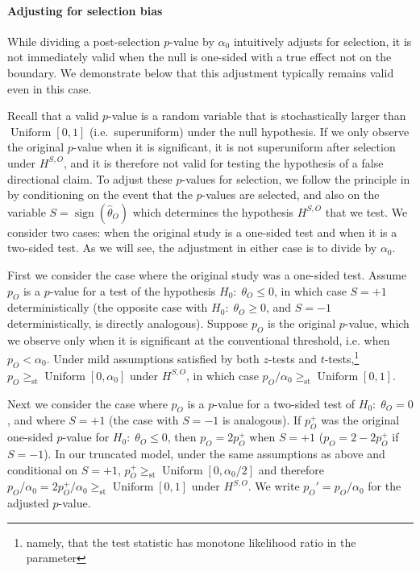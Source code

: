 \documentclass[11pt]{article}
\theoremstyle{definition}
\theoremstyle{custom}
\DeclareMathOperator{\sgn}{sign}
\DeclareMathOperator{\Uniform}{Uniform}
\newcommand{\htheta}{\hat{\theta}}
\newcommand{\ao}{\alpha_0}
\newcommand{\gest}{\ge_\text{st}}
\begin{document}
  \paragraph{Adjusting for selection bias} While dividing a post-selection $p$-value by $\ao$ intuitively adjusts for selection, it is not immediately valid when the null is one-sided with a true effect not on the boundary. We demonstrate below that this adjustment typically remains valid even in this case.

  Recall that a valid $p$-value is a random variable that is stochastically larger than $\Uniform[0, 1]$ (i.e.\ superuniform) under the null hypothesis. If we only observe the original $p$-value when it is significant, it is not superuniform after selection under $H^{S,O}$, and it is therefore not valid for testing the hypothesis of a false directional claim. To adjust these $p$-values for selection, we follow the principle in \citet{Fithian:2014ws} by conditioning on the event that the $p$-values are selected, and also on the variable $S = \sgn(\htheta_O)$ which determines the hypothesis $H^{S,O}$ that we test. We consider two cases: when the original study is a one-sided test and when it is a two-sided test. As we will see, the adjustment in either case is to divide by $\ao$.

  First we consider the case where the original study was a one-sided test. Assume $p_O$ is a $p$-value for a test of the hypothesis $H_0:\; \theta_O \le 0$, in which case $S = +1$ deterministically (the opposite case with $H_0:\; \theta_O \ge 0$, and $S = -1$ deterministically, is directly analogous). Suppose $p_O$ is the original $p$-value, which we observe only when it is significant at the conventional threshold, i.e. when $p_O < \ao$. Under mild assumptions satisfied by both $z$-tests and $t$-tests,\footnote{namely, that the test statistic has monotone likelihood ratio in the parameter} $p_O \gest \Uniform[0, \ao]$ under $H^{S,O}$, in which case $p_O/\ao \gest \Uniform[0,1]$.

  Next we consider the case where $p_O$ is a $p$-value for a two-sided test of $H_0:\; \theta_O = 0$, and where $S = +1$ (the case with $S = -1$ is analogous). If $p_O^+$ was the original one-sided $p$-value for $H_0:\; \theta_O\le 0$, then $p_O = 2p_O^+$ when $S=+1$ ($p_O = 2 - 2p_O^+$ if $S = -1$). In our truncated model, under the same assumptions as above and conditional on $S = +1$, $p_O^+ \gest \Uniform[0, \ao/2]$ and therefore $p_O/\ao = 2p_O^+/\ao \gest \Uniform[0, 1]$ under $H^{S,O}$. We write $p_O'=p_O/\ao$ for the adjusted $p$-value.
\end{document}
